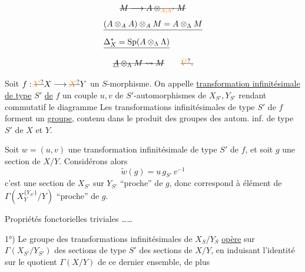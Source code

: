 \[
\deleted{M\longrightarrow A\otimes_{\unsure{A|\Lambda}} M}
\]
\[
\begin{aligned}
&\deleted{(A\otimes_A A)\otimes_A M=A\otimes_\Lambda M}\\
&\deleted{\Delta_X^{\ast}=\operatorname{Sp}(A\otimes_\Lambda\Lambda)}
\end{aligned}
\]
\[
\deleted{\underline A\otimes_\Lambda M\leadsto M}\qquad\deleted{\unsure{\check V}.}
\]

Soit $f:\deleted{\unsure{Y}}X\longrightarrow\deleted{\unsure{X}}Y$ un $S$-morphisme. On appelle \uline{transformation infinitésimale de type} $S'$ \uline{de} $f$ un couple $u,v$ de $S'$-automorphismes de $X_{S'},Y_{S'}$  rendant commutatif le diagramme
Les transformations infinitésimales  de type $S'$ de $f$ forment un \uline{groupe}, contenu dans le produit des groupes des autom. inf. de type $S'$ de $X$ et $Y$.

Soit $w=(u,v)$ une transformation infinitésimale de type $S'$ de $f$, et soit $g$ une section de $X/Y$. Considérons alors
\[
\widetilde w(g)=u\,g_{S'}\,v^{-1}
\]
c'est une section de $X_{S'}$ sur $Y_{S'}$ ``proche'' de $g$, donc correspond à   élément de $\Gamma(X_Y^{\{Y_{S'}\}}/Y)$ ``proche'' de $g$.

Propriétés fonctorielles triviales \ldots\ldots

1°) Le groupe des transformations infinitésimales  de $X_S/Y_S$ \uline{opère} sur $\Gamma(X_{S'}/Y_{S'})$ des sections  de type $S'$ des sections de $X/Y$, en induisant l'identité sur le quotient $\Gamma(X/Y)$ de ce dernier ensemble, de plus

